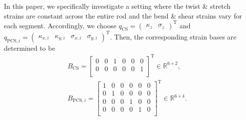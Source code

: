 In this paper, we specifically investigate a setting where the twist \& stretch strains are constant across the entire rod and the bend \& shear strains vary for each segment.
Accordingly, we choose $q_\mathrm{CS} = \begin{pmatrix} \kappa_z & \sigma_z \end{pmatrix}^\mathrm{T}$ and $q_{\mathrm{PCS},i} = \begin{pmatrix} \kappa_{x,i} & \kappa_{y,i} & \sigma_{x,i} & \sigma_{y,i} \end{pmatrix}^\mathrm{T}$.
Then, the corresponding strain bases are determined to be
\begin{equation}
\begin{split}
    B_\mathrm{CS} = \begin{bmatrix}
        0 & 0 & 1 & 0 & 0 & 0\\
        0 & 0 & 0 & 0 & 0 & 1\\
    \end{bmatrix}^\mathrm{T} \in \mathbb{R}^{6 \times 2},\\
    B_{\mathrm{PCS},i} = \begin{bmatrix}
        1 & 0 & 0 & 0 & 0 & 0\\
        0 & 1 & 0 & 0 & 0 & 0\\
        0 & 0 & 0 & 1 & 0 & 0\\
        0 & 0 & 0 & 0 & 1 & 0\\
    \end{bmatrix}^\mathrm{T} \in \mathbb{R}^{6 \times 4}.
\end{split}
\end{equation}

